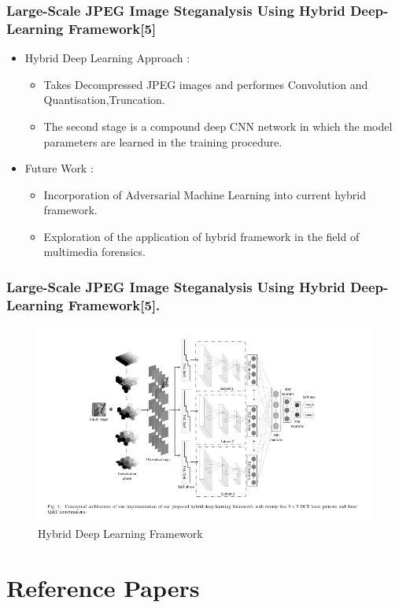 \documentclass{beamer} %
\theoremstyle{definition} %
\begin{document}
\begin{frame}
\frametitle{Large-Scale JPEG Image Steganalysis Using Hybrid Deep-Learning Framework[5]  }
\begin{itemize}
\item Hybrid Deep Learning Approach :
\begin{itemize}
	\item Takes Decompressed JPEG images and performes Convolution and Quantisation,Truncation.
	\item The second stage is a compound deep CNN network in which the model parameters are learned in the training procedure. 
\end{itemize}
\item Future Work : 
\begin{itemize}
	\item Incorporation of Adversarial Machine Learning into current hybrid framework. 
	\item Exploration of the application of hybrid framework in
	the field of multimedia forensics. 
\end{itemize}
\end{itemize}
\end{frame}

\begin{frame}
\frametitle{Large-Scale JPEG Image Steganalysis Using Hybrid Deep-Learning Framework[5].}

\begin{figure}
	\includegraphics[scale=0.3]{jpegStegAnalysis.png}
	\caption{Hybrid Deep Learning Framework}
\end{figure}
\end{frame}


\section{Reference Papers}
\end{document}
